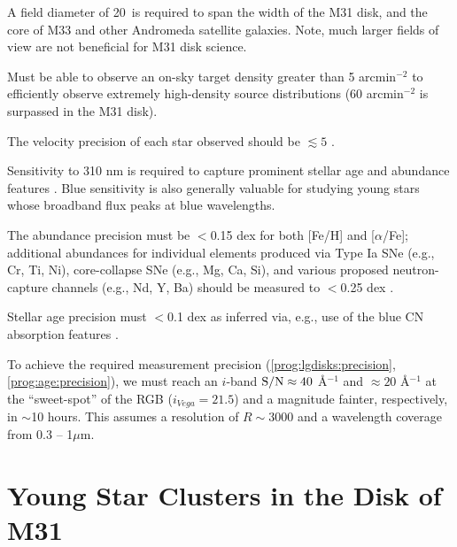 \documentclass[11pt,a4paper,twoside,onecolumn,openany,final,oldfontcommands]{memoir}
\begin{document}
\medskip
\begin{sciencerequirement}

\reqitem A field diameter of 20\arcmin\ is required to span the width of the M31 disk, and the core of M33 and other Andromeda satellite galaxies.  Note, much larger fields of view are not beneficial for M31 disk science.

\reqitem Must be able to observe an on-sky target density greater than 5 arcmin$^{-2}$ to efficiently observe extremely high-density source distributions (60 arcmin$^{-2}$ is surpassed in the M31 disk).

\reqitem The velocity precision of each star observed should be $\lesssim 5$ \kms.  

\reqitem Sensitivity to 310 nm is required to capture prominent stellar age and abundance features \citep[Fig.~\ref{fig:abundances_blue}; cf.][]{Sandford20}.  Blue sensitivity is also generally valuable for studying young stars whose broadband flux peaks at blue wavelengths.

\reqitem The abundance precision must be $<$0.15 dex for both [Fe/H] and [$\alpha$/Fe]; additional abundances for individual elements produced via Type Ia SNe (e.g., Cr, Ti, Ni), core-collapse SNe (e.g., Mg, Ca, Si), and various proposed neutron-capture channels (e.g., Nd, Y, Ba) should be measured to $<$0.25 dex \citep[Fig.~\ref{fig:abundances_snr}; cf.][]{Sandford20}. \label{prog:lgdisks:precision}

\reqitem Stellar age precision must $<$0.1 dex as inferred via, e.g., use of the blue CN absorption features \citep[e.g.][]{Martig16,Ting19}.  %
\label{prog:age:precision}

\reqitem To achieve the required measurement precision (\ref{prog:lgdisks:precision}, \ref{prog:age:precision}), we must reach an $i$-band ${\rm S/N} \approx 40$ \AA$^{-1}$ and $\approx 20$ \AA$^{-1}$ at the  ``sweet-spot'' of the RGB ($i_{Vega} = 21.5$) and a magnitude fainter, respectively, in $\sim$10 hours.  This assumes a resolution of $R\sim3000$ and a wavelength coverage from 0.3 -- 1$\mu$m.
\end{sciencerequirement}


\section{Young Star Clusters in the Disk of M31}
\end{document}
